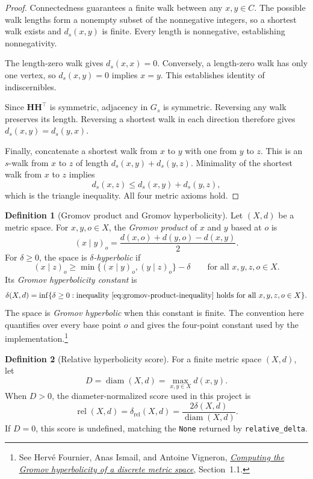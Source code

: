 \documentclass{article}
\theoremstyle{definition}
\newtheorem{definition}{Definition}
\theoremstyle{plain}
\begin{document}
\begin{proof}
Connectedness guarantees a finite walk between any $x,y\in C$.
The possible walk lengths form a nonempty subset of the nonnegative
integers, so a shortest walk exists and $d_s(x,y)$ is finite.
Every length is nonnegative, establishing nonnegativity.

The length-zero walk gives $d_s(x,x)=0$. Conversely, a length-zero
walk has only one vertex, so $d_s(x,y)=0$ implies $x=y$.
This establishes identity of indiscernibles.

Since $\mathbf{H}\mathbf{H}^{\top}$ is symmetric, adjacency in $G_s$
is symmetric. Reversing any walk preserves its length. Reversing a
shortest walk in each direction therefore gives $d_s(x,y)=d_s(y,x)$.

Finally, concatenate a shortest walk from $x$ to $y$ with one from
$y$ to $z$. This is an $s$-walk from $x$ to $z$ of length
$d_s(x,y)+d_s(y,z)$. Minimality of the shortest walk from $x$ to $z$
implies
\[
  d_s(x,z)\leq d_s(x,y)+d_s(y,z),
\]
which is the triangle inequality. All four metric axioms hold.
\end{proof}

\begin{definition}[Gromov product and Gromov hyperbolicity]
\label{def:gromov-hyperbolicity}
Let $(X,d)$ be a metric space. For $x,y,o\in X$, the
\emph{Gromov product} of $x$ and $y$ based at $o$ is
\[
  (x\mid y)_o=\frac{d(x,o)+d(y,o)-d(x,y)}{2}.
\]
For $\delta\geq0$, the space is \emph{$\delta$-hyperbolic} if
\begin{equation}
  \label{eq:gromov-product-inequality}
  (x\mid z)_o\geq
  \min\{(x\mid y)_o,(y\mid z)_o\}-\delta
  \qquad\text{for all }x,y,z,o\in X.
\end{equation}
Its \emph{Gromov hyperbolicity constant} is
\[
  \delta(X,d)=\inf\{\delta\geq0:
                  \text{inequality~\eqref{eq:gromov-product-inequality}
                  holds for all }x,y,z,o\in X\}.
\]
The space is \emph{Gromov hyperbolic} when this constant is finite.
The convention here quantifies over every base point $o$ and gives
the four-point constant used by the implementation.\footnote{See
Herv\'e Fournier, Anas Ismail, and Antoine Vigneron,
\href{https://webusers.imj-prg.fr/~herve.fournier/publications/hyperbolicity.pdf}{\emph{Computing
the Gromov hyperbolicity of a discrete metric space}}, Section~1.1.}
\end{definition}

\begin{definition}[Relative hyperbolicity score]
\label{def:relative-hyperbolicity}
For a finite metric space $(X,d)$, let
\[
  D=\operatorname{diam}(X,d)=\max_{x,y\in X}d(x,y).
\]
When $D>0$, the diameter-normalized score used in this project is
\begin{equation}
  \label{eq:relative-hyperbolicity}
  \boxed{\operatorname{rel}(X,d)
    =\delta_{\mathrm{rel}}(X,d)
    =\frac{2\delta(X,d)}{\operatorname{diam}(X,d)}.}
\end{equation}
If $D=0$, this score is undefined, matching the \texttt{None} returned
by \texttt{relative\_delta}.
\end{definition}
\end{document}
